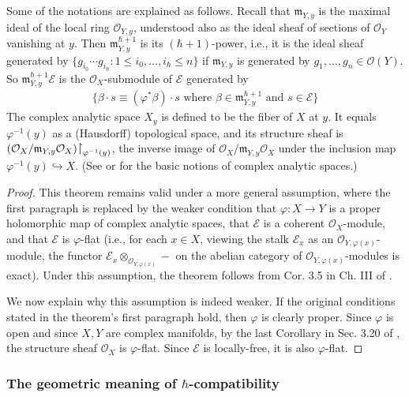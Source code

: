 \documentclass[11pt,b5paper,notitlepage]{article}
\theoremstyle{definition}
\theoremstyle{plain}
\newcommand{\scr}{\mathscr}
\newcommand{\<}{\left\langle}
\renewcommand{\>}{\right\rangle}
\newcommand{\MO}{\mathcal{O}}
\newcommand{\mk}{\mathfrak m}
\numberwithin{equation}{section}
\begin{document}
Some of the notations are explained as follows. Recall that $\mk_{Y,y}$ is the maximal ideal of the local ring $\MO_{Y,y}$, understood also as the ideal sheaf of sections of $\MO_Y$ vanishing at $y$. Then $\mk_{Y,y}^{\hbar+1}$ is its $(\hbar+1)$-power, i.e., it is the ideal sheaf generated by $\{g_{i_0}\cdots g_{i_\hbar}:1\leq i_0,\dots,i_\hbar\leq n\}$ if $\mk_{Y,y}$ is generated by $g_1,\dots,g_n\in \MO(Y)$. So $\mk_{Y,y}^{\hbar+1}\scr E$ is the $\MO_X$-submodule of $\scr E$ generated by
\begin{align*}
\{\beta\cdot s\equiv (\varphi^*\beta)\cdot s\text{ where }\beta\in \mk_{Y,y}^{\hbar+1}\text{ and }s\in\scr E\}
\end{align*}
The complex analytic space $X_y$ is defined to be the fiber of $X$ at $y$. It equals $\varphi^{-1}(y)$ as a (Hausdorff) topological space, and its structure sheaf is $(\MO_X/\mk_{Y,y}\MO_X)\scalebox{1.2}{$\upharpoonright$}_{\varphi^{-1}(y)}$, the inverse image of $\MO_X/\mk_{Y,y}\MO_X$ under the inclusion map $\varphi^{-1}(y)\hookrightarrow X$. (See \cite{Fis76} or \cite{GR84} for the basic notions of complex analytic spaces.)

\begin{proof}
This theorem remains valid under a more general assumption, where the first paragraph is replaced by the weaker condition that $\varphi:X\rightarrow Y$ is a proper holomorphic map of complex analytic spaces, that $\scr E$ is a coherent $\MO_X$-module, and that $\scr E$ is $\varphi$-flat (i.e., for each $x\in X$, viewing the stalk $\scr E_x$ as an $\MO_{Y,\varphi(x)}$-module, the functor $\scr E_x\otimes_{\MO_{Y,\varphi(x)}}-$ on the abelian category of $\MO_{Y,\varphi(x)}$-modules is exact). Under this assumption, the theorem follows from Cor. 3.5 in Ch. III of \cite{BaSt}.

We now explain why this assumption is indeed weaker. If the original conditions stated in the theorem's first paragraph hold, then $\varphi$ is clearly proper. Since $\varphi$ is open and since $X,Y$ are complex manifolds, by the last Corollary in Sec. 3.20 of \cite{Fis76}, the structure sheaf $\MO_X$ is $\varphi$-flat. Since $\scr E$ is locally-free, it is also $\varphi$-flat.
\end{proof}




\subsubsection{The geometric meaning of $\hbar$-compatibility}
\end{document}

